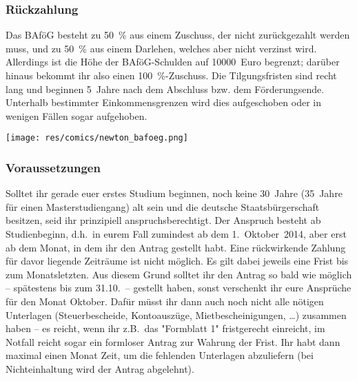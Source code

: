 \begin{multicols*}{2}
\subsubsection*{Rückzahlung}
Das BAföG besteht zu \SI{50}{\percent} aus einem Zuschuss, der nicht zurückgezahlt werden muss, und zu \SI{50}{\percent} aus einem Darlehen, welches aber nicht verzinst wird. Allerdings ist die Höhe der BAföG-Schulden auf \num{10000}~Euro begrenzt; darüber hinaus bekommt ihr also einen \SI{100}{\percent}-Zuschuss. Die Tilgungsfristen sind recht lang und beginnen 5~Jahre nach dem Abschluss bzw. dem Förderungsende. Unterhalb bestimmter Einkommensgrenzen wird dies aufgeschoben oder in wenigen Fällen sogar aufgehoben.

\begin{center}
\texttt{[image: res/comics/newton\_bafoeg.png]}
\end{center}

\subsubsection*{Voraussetzungen}
Solltet ihr gerade euer erstes Studium beginnen, noch keine 30~Jahre (35~Jahre für einen Masterstudiengang) alt sein und die deutsche Staatsbürgerschaft besitzen, seid ihr prinzipiell anspruchsberechtigt. Der Anspruch besteht ab Studienbeginn, d.h.\ in eurem Fall zumindest ab dem 1.~Oktober~2014, aber erst ab dem Monat, in dem ihr den Antrag gestellt habt. Eine rückwirkende Zahlung für davor liegende Zeiträume ist nicht möglich. Es gilt dabei jeweils eine Frist bis zum Monatsletzten. Aus diesem Grund solltet ihr den Antrag so bald wie möglich -- spätestens bis zum 31.10.\ -- gestellt haben, sonst verschenkt ihr eure Ansprüche für den Monat Oktober. Dafür müsst ihr dann auch noch nicht alle nötigen Unterlagen (Steuerbescheide, Kontoauszüge, Mietbescheinigungen, \dots) zusammen haben -- es reicht, wenn ihr z.B.\ das "Formblatt 1" fristgerecht einreicht, im Notfall reicht sogar ein formloser Antrag zur Wahrung der Frist. Ihr habt dann maximal einen Monat Zeit, um die fehlenden Unterlagen abzuliefern (bei Nichteinhaltung wird der Antrag abgelehnt).


\end{multicols*}
